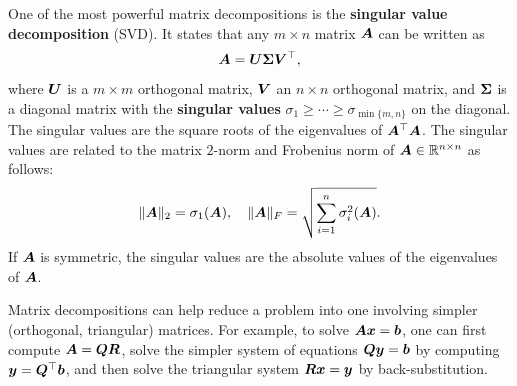\documentclass[11pt,a4paper]{memoir}
\begin{document}
One of the most powerful matrix decompositions is the \textbf{singular value decomposition} (SVD). It states that any $m\times n$ matrix $\bm{A}$ can be written as
\begin{equation*}
 \bm{A} = \bm{U}\bm{\Sigma}\bm{V}^{\top},
\end{equation*}
where $\bm{U}$ is a $m\times m$ orthogonal matrix, $\bm{V}$ an $n\times n$ orthogonal matrix, and $\bm{\Sigma}$ is a diagonal matrix with the \textbf{singular values} $\sigma_1\geq \cdots\geq \sigma_{\min\{m,n\}}$ on the diagonal. The singular values are the square roots of the eigenvalues of $\bm{A}^{\top}\bm{A}$. The singular values are related to the matrix $2$-norm and Frobenius norm of $\bm{A}\in \mathbb{R}^{n\times n}$ as follows:
\begin{equation*}
  \Vert {\bm{A}}\Vert_2 = \sigma_1(\bm{A}), \quad \Vert {\bm{A}}\Vert_F = \sqrt{\sum_{i=1}^n \sigma_i^2(\bm{A})}. 
\end{equation*}
If $\bm{A}$ is symmetric, the singular values are the absolute values of the eigenvalues of $\bm{A}$.

Matrix decompositions can help reduce a problem into one involving simpler (orthogonal, triangular) matrices. For example, to solve $\bm{A}\bm{x}=\bm{b}$, one can first compute $\bm{A}=\bm{Q}\bm{R}$, solve the simpler system of equations $\bm{Q}\bm{y}=\bm{b}$ by computing $\bm{y}=\bm{Q}^{\top}\bm{b}$, and then solve the triangular system $\bm{R}\bm{x}=\bm{y}$ by back-substitution. 
\end{document}
